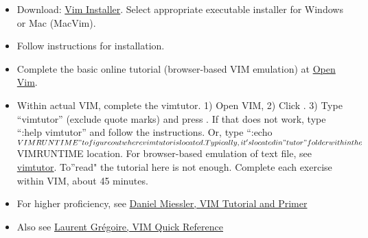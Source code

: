 \documentclass[]{article}
\begin{document}
\begin{itemize}
\itemsep1pt\parskip0pt
\item
  Download: \href{http://www.vim.org/}{Vim Installer}. Select
  appropriate executable installer for Windows or Mac (MacVim).
\item
  Follow instructions for installation.
\item
  Complete the basic online tutorial (browser-based VIM emulation) at
  \href{http://www.openvim.com/tutorial.html}{Open Vim}.
\item
  Within actual VIM, complete the vimtutor. 1) Open VIM, 2) Click . 3)
  Type ``vimtutor'' (exclude quote marks) and press . If that does not
  work, type ``:help vimtutor'' and follow the instructions. Or, type
  ``:echo
  $VIMRUNTIME" to figure     out where vimtutor is located. Typically, it's located in "tutor" folder within     the $VIMRUNTIME
  location. For browser-based emulation of text file, see
  \href{http://www2.geog.ucl.ac.uk/~plewis/teaching/unix/vimtutor}{vimtutor}.
  To''read" the tutorial here is not enough. Complete each exercise
  within VIM, about 45 minutes.
\item
  For higher proficiency, see
  \href{http://www.danielmiessler.com/study/vim/}{Daniel Miessler, VIM
  Tutorial and Primer}
\item
  Also see \href{http://tnerual.eriogerg.free.fr/vimqrc.pdf}{Laurent
  Grégoire, VIM Quick Reference}
\end{itemize}
\end{document}

